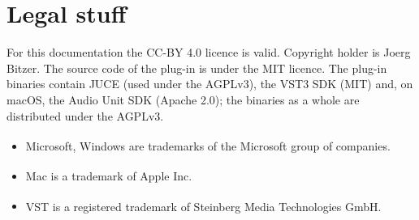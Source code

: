 \documentclass[11pt]{article}
\newcommand{\pluginauthor}{Joerg Bitzer}
\begin{document}
\section{Legal stuff}
For this documentation the CC-BY 4.0 licence is valid. Copyright holder is \pluginauthor.
The source code of the plug-in is under the MIT licence. The plug-in binaries contain JUCE
(used under the AGPLv3), the VST3 SDK (MIT) and, on macOS, the Audio Unit SDK (Apache 2.0);
the binaries as a whole are distributed under the AGPLv3.

\begin{itemize}
    \item Microsoft\textsuperscript{\textregistered}, Windows\textsuperscript{\textregistered}
    are trademarks of the Microsoft group of companies.
    \item Mac\textsuperscript{\textregistered} is a trademark of Apple Inc.
    \item VST\textsuperscript{\textregistered} is a registered trademark of Steinberg Media
    Technologies GmbH.
\end{itemize}
\end{document}
